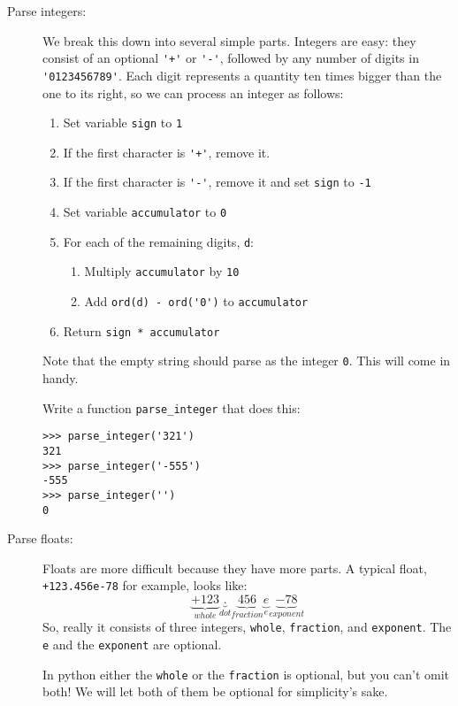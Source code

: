\documentclass[12pt]{article}
\begin{document}
\begin{description}
\item[Parse integers:]
We break this down into several simple parts.  Integers
are easy: they consist of an optional \lstinline{'+'} or
\lstinline{'-'}, followed by any number of digits
in \lstinline{'0123456789'}.  Each digit represents a quantity ten
times bigger than the one to its right, so we can
process an integer  as follows:
\begin{enumerate}
\item Set variable \lstinline{sign} to \lstinline{1}
\item If the first character is \lstinline{'+'}, remove it.
\item If the first character is \lstinline{'-'}, remove it and 
set \lstinline{sign} to \lstinline{-1}
\item Set variable \lstinline{accumulator} to \lstinline{0}
\item For each of the remaining digits, \lstinline{d}:
\begin{enumerate}
\item Multiply \lstinline{accumulator} by \lstinline{10}
\item Add \lstinline{ord(d) - ord('0')} to \lstinline{accumulator}
\end{enumerate}
\item Return \lstinline{sign * accumulator}
\end{enumerate}
Note that the empty string should parse as the integer \lstinline{0}.
This will come in handy.

Write a function \lstinline{parse_integer} that does this:
\begin{lstlisting}
>>> parse_integer('321')
321
>>> parse_integer('-555')
-555
>>> parse_integer('')
0
\end{lstlisting}


\item[Parse floats:] Floats are more difficult because
they have more parts.  A typical float, \lstinline{+123.456e-78}
for example, looks like:
\[
\underbrace{+123}_{whole}%
\underbrace{.}_{dot}\underbrace{456}_{fraction}%
\underbrace{e}_{e}\underbrace{-78}_{exponent}
\]
So, really it consists of three integers, \lstinline{whole},
\lstinline{fraction}, and \lstinline{exponent}.
The \lstinline{e} and the \lstinline{exponent} are optional.

In python either the \lstinline{whole} or the \lstinline{fraction}
is optional, but you can't omit both!  We will let both of
them be optional for simplicity's sake.


\end{description}
\end{document}
